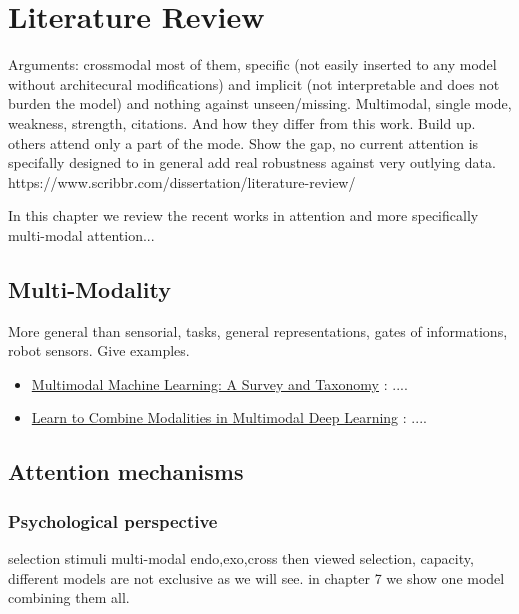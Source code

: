 \chapter{Literature Review}\label{chapter-literature-review} 

Arguments: crossmodal most of them, specific (not easily inserted to any model without architecural modifications) and implicit (not interpretable and does not burden the model) and nothing against unseen/missing. Multimodal, single mode, weakness, strength, citations. And how they differ from this work. Build up. others attend only a part of the mode. Show the gap, no current attention is specifally designed to in general add real robustness against very outlying data. https://www.scribbr.com/dissertation/literature-review/

In this chapter we review the recent works in attention and more specifically multi-modal attention...

\section{Multi-Modality}
More general than sensorial, tasks, general representations, gates of informations, robot sensors. Give examples. 
\begin{itemize}
\item \href{https://ieeexplore.ieee.org/document/8269806}{Multimodal Machine Learning: A Survey and Taxonomy} \citep{taxomany-multimodal}: ....
\item \href{https://arxiv.org/abs/1805.11730}{Learn to Combine Modalities in Multimodal Deep Learning} \citep{combine-multimod}: ....
\end{itemize}


\section{Attention mechanisms}\label{sec:background-attention}

\subsection*{Psychological perspective}
selection stimuli multi-modal endo,exo,cross then viewed selection, capacity, different models are not exclusive as we will see. in chapter 7 we show one model combining them all. 


